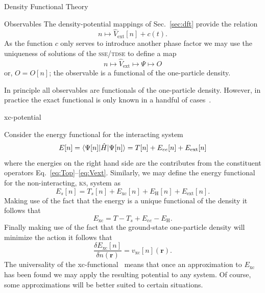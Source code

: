 \documentclass[letterpaper, 10 pt]{report}
\begin{document}
\begin{chapter}{Density Functional Theory \label{chap:dft}}
\begin{section}{Observables \label{sec:obs}}
      The density-potential mappings of Sec.~\ref{sec:dft} provide the relation
      \begin{equation} \label{eq:denpot}
         n \mapsto \hat{V}_\mathrm{ext}[n] + c(t).
      \end{equation}
      As the function $c$ only serves to introduce another phase factor we may use the uniqueness of
      solutions of the \textsc{sse}/\textsc{tdse} to define a map
      \begin{equation} \label{eq:obsfunc2}
         n \mapsto \hat{V}_\mathrm{ext} \mapsto \Psi \mapsto O
      \end{equation}
      or, $O = O[n]$; the observable is a functional of the one-particle density.

      In principle all observables are functionals of the one-particle density. However, in practice the
      exact functional is only known in a handful of cases~\cite[p. 211-213]{obs_exac}.

   \end{section}

   \begin{section}{xc-potential \label{sec:xcpot}}

      Consider the energy functional for the interacting system
      \begin{equation} \label{eq:efunc}
         E[n] = \braket{\Psi[n] | \hat{H} | \Psi[n] }= T[n] + E_{ee}[n] + E_\mathrm{ext}[n]
      \end{equation}
      where the energies on the right hand side are the contributes from the constituent operators
      Eq.~\eqref{eq:Top}--\eqref{eq:Vext}. Similarly, we may define the energy functional for the
      non-interacting, \textsc{ks}, system as
      \begin{equation} \label{eq:esfunc}
         E_s[n] =  T_s[n] + E_\mathrm{xc}[n] + E_\mathrm{H}[n] + E_\mathrm{ext}[n].
      \end{equation}
      Making use of the fact that the energy is a unique functional of the density it follows that
      \begin{equation} \label{eq:exc}
         E_\mathrm{xc} = T - T_s + E_{ee} - E_\mathrm{H}.
      \end{equation}
      Finally making use of the fact that the ground-state one-particle density will minimize the action
      it follows that
      \begin{equation} \label{eq:vxc-der}
         \frac{\delta E_\mathrm{xc}[n]}{\delta n(\mathbf{r})} = v_\mathrm{xc}[n](\mathbf{r}).
      \end{equation}
      The universality of the xc-functional~\cite{dft-engel} means that once an approximation to
      $E_\mathrm{xc}$ has been found we may apply the resulting potential to any system. Of course,
      some approximations will be better suited to certain situations.


\end{section}
\end{chapter}
\end{document}
